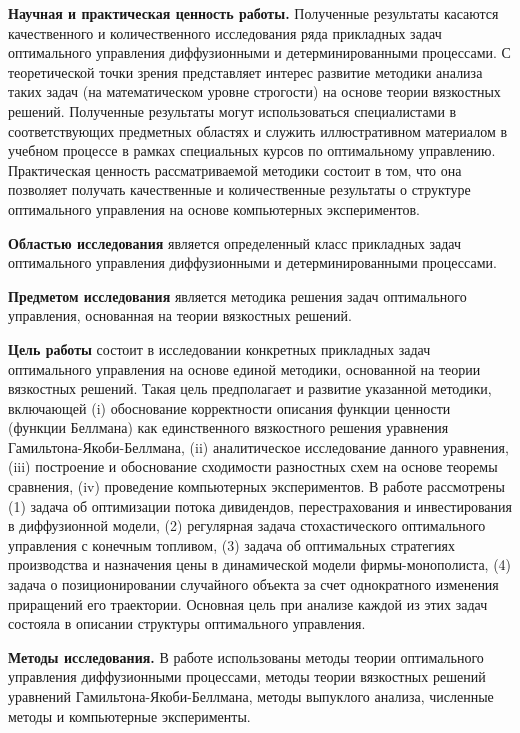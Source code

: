 \documentclass[twoside,12pt]{article}
\begin{document}
\textbf{Научная и практическая ценность работы.} Полученные результаты касаются качественного и количественного исследования ряда прикладных задач оптимального управления диффузионными и детерминированными процессами. С теоретической точки зрения представляет интерес развитие методики анализа таких задач (на математическом уровне строгости) на основе теории вязкостных решений. Полученные результаты могут использоваться специалистами в соответствующих предметных областях и служить иллюстративном материалом в учебном процессе в рамках специальных курсов по оптимальному управлению. Практическая ценность рассматриваемой методики состоит в том, что она позволяет получать качественные и количественные результаты о структуре оптимального управления на основе компьютерных экспериментов.

\textbf{Областью исследования} является определенный класс прикладных задач оптимального управления диффузионными и детерминированными процессами.

\textbf{Предметом исследования} является методика решения задач оптимального управления, основанная на теории вязкостных решений.

\textbf{Цель работы} состоит в исследовании конкретных прикладных задач оптимального управления на основе единой методики, основанной на теории вязкостных решений. Такая цель предполагает и развитие указанной методики, включающей (i) обоснование корректности описания функции ценности (функции Беллмана) как единственного вязкостного решения уравнения Гамильтона-Якоби-Беллмана, (ii) аналитическое исследование данного уравнения, (iii) построение и обоснование сходимости разностных схем на основе теоремы сравнения, (iv) проведение компьютерных экспериментов. В работе рассмотрены (1) задача об оптимизации потока дивидендов, перестрахования и инвестирования в диффузионной модели, (2) регулярная задача стохастического оптимального управления с конечным топливом, (3) задача об оптимальных стратегиях производства и назначения цены в динамической модели фирмы-монополиста, (4) задача о позиционировании случайного объекта за счет однократного изменения приращений его траектории. Основная цель при анализе каждой из этих задач состояла в описании структуры оптимального управления.

\textbf{Методы исследования.} В работе использованы методы теории оптимального управления диффузионными процессами, методы теории вязкостных решений уравнений Гамильтона-Якоби-Беллмана, методы выпуклого анализа, численные методы и компьютерные эксперименты.
\end{document}
